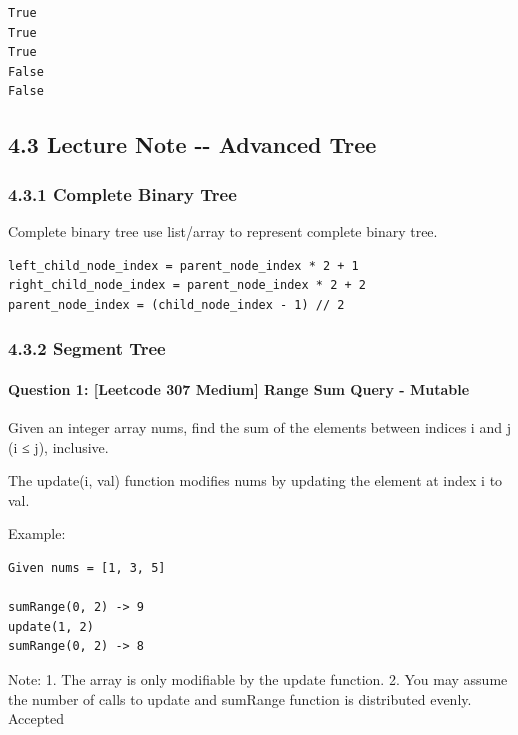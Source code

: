 \documentclass[11pt]{article}
\begin{document}
    \begin{Verbatim}[commandchars=\\\{\}]
True
True
True
False
False

    \end{Verbatim}

    \subsection{4.3 Lecture Note -\/- Advanced
Tree}\label{lecture-note----advanced-tree}

    \subsubsection{4.3.1 Complete Binary Tree}\label{complete-binary-tree}

Complete binary tree use list/array to represent complete binary tree.

\begin{verbatim}
left_child_node_index = parent_node_index * 2 + 1
right_child_node_index = parent_node_index * 2 + 2
parent_node_index = (child_node_index - 1) // 2
\end{verbatim}

    \subsubsection{4.3.2 Segment Tree}\label{segment-tree}

\paragraph{Question 1: {[}Leetcode 307 Medium{]} Range Sum Query -
Mutable}\label{question-1-leetcode-307-medium-range-sum-query---mutable}

Given an integer array nums, find the sum of the elements between
indices i and j (i ≤ j), inclusive.

The update(i, val) function modifies nums by updating the element at
index i to val.

Example:

\begin{verbatim}
Given nums = [1, 3, 5]

sumRange(0, 2) -> 9
update(1, 2)
sumRange(0, 2) -> 8
\end{verbatim}

Note: 1. The array is only modifiable by the update function. 2. You may
assume the number of calls to update and sumRange function is
distributed evenly. Accepted
\end{document}
